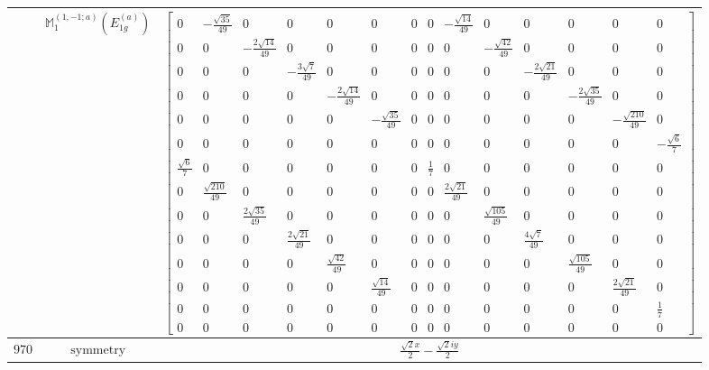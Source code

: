 \documentclass[fleqn,8pt,landscape]{jsarticle}
\begin{document}
\begin{longtable}{ccc}
$  $ & $ \mathbb{M}_{1}^{(1,-1;a)}(E_{1g}^{(a)}) $ & $ \begin{bmatrix} 0 & - \frac{\sqrt{35}}{49} & 0 & 0 & 0 & 0 & 0 & 0 & - \frac{\sqrt{14}}{49} & 0 & 0 & 0 & 0 & 0 \\ 0 & 0 & - \frac{2 \sqrt{14}}{49} & 0 & 0 & 0 & 0 & 0 & 0 & - \frac{\sqrt{42}}{49} & 0 & 0 & 0 & 0 \\ 0 & 0 & 0 & - \frac{3 \sqrt{7}}{49} & 0 & 0 & 0 & 0 & 0 & 0 & - \frac{2 \sqrt{21}}{49} & 0 & 0 & 0 \\ 0 & 0 & 0 & 0 & - \frac{2 \sqrt{14}}{49} & 0 & 0 & 0 & 0 & 0 & 0 & - \frac{2 \sqrt{35}}{49} & 0 & 0 \\ 0 & 0 & 0 & 0 & 0 & - \frac{\sqrt{35}}{49} & 0 & 0 & 0 & 0 & 0 & 0 & - \frac{\sqrt{210}}{49} & 0 \\ 0 & 0 & 0 & 0 & 0 & 0 & 0 & 0 & 0 & 0 & 0 & 0 & 0 & - \frac{\sqrt{6}}{7} \\ \frac{\sqrt{6}}{7} & 0 & 0 & 0 & 0 & 0 & 0 & \frac{1}{7} & 0 & 0 & 0 & 0 & 0 & 0 \\ 0 & \frac{\sqrt{210}}{49} & 0 & 0 & 0 & 0 & 0 & 0 & \frac{2 \sqrt{21}}{49} & 0 & 0 & 0 & 0 & 0 \\ 0 & 0 & \frac{2 \sqrt{35}}{49} & 0 & 0 & 0 & 0 & 0 & 0 & \frac{\sqrt{105}}{49} & 0 & 0 & 0 & 0 \\ 0 & 0 & 0 & \frac{2 \sqrt{21}}{49} & 0 & 0 & 0 & 0 & 0 & 0 & \frac{4 \sqrt{7}}{49} & 0 & 0 & 0 \\ 0 & 0 & 0 & 0 & \frac{\sqrt{42}}{49} & 0 & 0 & 0 & 0 & 0 & 0 & \frac{\sqrt{105}}{49} & 0 & 0 \\ 0 & 0 & 0 & 0 & 0 & \frac{\sqrt{14}}{49} & 0 & 0 & 0 & 0 & 0 & 0 & \frac{2 \sqrt{21}}{49} & 0 \\ 0 & 0 & 0 & 0 & 0 & 0 & 0 & 0 & 0 & 0 & 0 & 0 & 0 & \frac{1}{7} \\ 0 & 0 & 0 & 0 & 0 & 0 & 0 & 0 & 0 & 0 & 0 & 0 & 0 & 0 \end{bmatrix} $ \\ \hline
$ 970 $ & $ \text{symmetry} $ & $ \frac{\sqrt{2} x}{2} - \frac{\sqrt{2} i y}{2} $ \\

\end{longtable}
\end{document}
